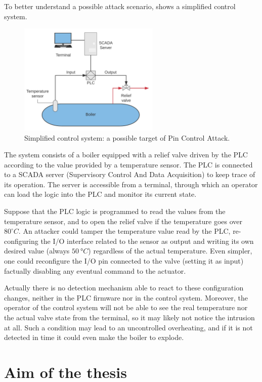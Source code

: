 To better understand a possible attack scenario,  shows a simplified control system.
\begin{figure}[h!]
\centerline{\includegraphics[width=0.6\textwidth]{res/control}}
\caption{Simplified control system: a possible target of Pin Control Attack.\label{fig:control}}
\end{figure}

The system consists of a boiler equipped with a relief valve driven by the PLC according to the value provided by a temperature sensor.
The PLC is connected to a SCADA server (Supervisory Control And Data Acquisition) to keep trace of its operation.
The server is accessible from a terminal, through which an operator can load the logic into the PLC and monitor its current state.

Suppose that the PLC logic is programmed to read the values from the temperature sensor, and to open the relief valve if the temperature goes over $80^\circ C$.
An attacker could tamper the temperature value read by the PLC, re-configuring the I/O interface related to the sensor as output and writing its own desired value
(\eg always $\SI{50}{\degree C}$) regardless of the actual temperature.
Even simpler, one could reconfigure the I/O pin connected to the valve (\eg setting it as input) factually disabling any eventual command to the actuator.

Actually there is no detection mechanism able to react to these configuration changes, neither in the PLC firmware nor in the control system.
Moreover, the operator of the control system will not be able to see the real temperature nor the actual valve state from the terminal,
so it may likely not notice the intrusion at all.
Such a condition may lead to an uncontrolled overheating, and if it is not detected in time it could even make the boiler to explode.


\section{Aim of the thesis}

